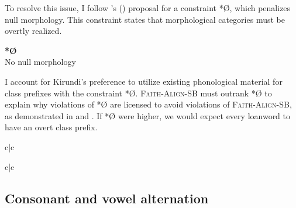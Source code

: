 \documentclass[output=paper,colorlinks,citecolor=brown,
]{langscibook}
\begin{document}
To resolve this issue, I follow \citeauthor{Aissen1999}’s (\citeyear{Aissen1999}) proposal for a constraint *{Ø}, which penalizes null morphology. This constraint states that morphological categories must be overtly realized. 

\ea \label{ex:kinchsular:nonull}
     \textbf{*Ø}
    \\ No null morphology
\z 

I account for Kirundi's preference to utilize existing phonological material for class prefixes with the constraint *{Ø}. \textsc{Faith-Align-SB} must outrank *{Ø} to explain why violations of *{Ø} are licensed to avoid violations of \textsc{Faith-Align-SB}, as demonstrated in  and . If *{Ø} were higher, we would expect every loanword to have an overt class prefix.

\begin{table}
\ShadingOn
  \caption{Evaluation of /kilo/}
  \label{tab:kinchsular:kilotableau}
  
\begin{tableau}{c|c} 

 \vio{} \vio{}  
 \vio{} \vio{*!}  
 \vio{*!} \vio{}  
 \vio{*!} \vio{}  
\end{tableau}
\end{table}

\begin{table}
\ShadingOn
  \caption{Evaluation of /bætəɹi/}
  \label{tab:kinchsular:batterytableau}
  
\begin{tableau}{c|c} 

 \vio{} \vio{*}  
 \vio{*!} \vio{}  
 \vio{*!} \vio{}  
\end{tableau}
\end{table}

\subsection{Consonant and vowel alternation} \label{sec:kinchsular:cvalternation}
\end{document}
